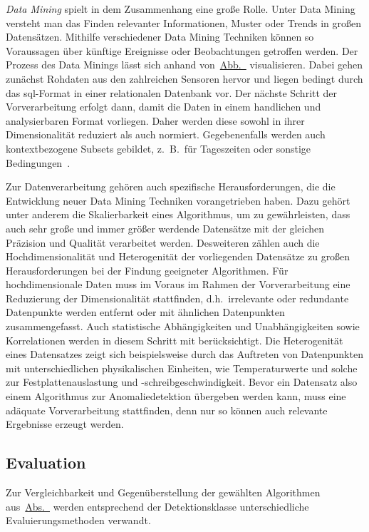 \textit{Data Mining} spielt in dem Zusammenhang eine große Rolle. Unter Data Mining versteht man das Finden relevanter Informationen,
Muster oder Trends in großen Datensätzen. Mithilfe verschiedener Data Mining Techniken können so Voraussagen über künftige Ereignisse oder
Beobachtungen getroffen werden. Der Prozess des Data Minings lässt sich anhand von~\hyperref[fig:data_mining]{Abb.~}
visualisieren. Dabei gehen zunächst Rohdaten aus den zahlreichen Sensoren hervor und liegen bedingt durch das \ac{sql}-Format in einer
relationalen Datenbank vor. Der nächste Schritt der Vorverarbeitung erfolgt dann, damit die Daten in einem handlichen und analysierbaren
Format vorliegen. Daher werden diese sowohl in ihrer Dimensionalität reduziert als auch normiert. Gegebenenfalls werden auch
kontextbezogene Subsets gebildet, z.~B.~für Tageszeiten oder sonstige Bedingungen~\Cite[Kap.~1]{Tan2014}.

Zur Datenverarbeitung gehören auch spezifische Herausforderungen, die die Entwicklung neuer Data Mining Techniken vorangetrieben haben.
Dazu gehört unter anderem die Skalierbarkeit eines Algorithmus, um zu gewährleisten, dass auch sehr große und immer größer werdende
Datensätze mit der gleichen Präzision und Qualität verarbeitet werden. Desweiteren zählen auch die Hochdimensionalität und Heterogenität
der vorliegenden Datensätze zu großen Herausforderungen bei der Findung geeigneter Algorithmen. Für hochdimensionale Daten muss im Voraus
im Rahmen der Vorverarbeitung eine Reduzierung der Dimensionalität stattfinden, d.h.~irrelevante oder redundante Datenpunkte werden
entfernt oder mit ähnlichen Datenpunkten zusammengefasst. Auch statistische Abhängigkeiten und Unabhängigkeiten sowie Korrelationen
werden in diesem Schritt mit berücksichtigt. Die Heterogenität eines Datensatzes zeigt sich beispielsweise durch das Auftreten von
Datenpunkten mit unterschiedlichen physikalischen Einheiten, wie Temperaturwerte und solche zur Festplattenauslastung und
-schreibgeschwindigkeit. Bevor ein Datensatz also einem Algorithmus zur Anomaliedetektion übergeben werden kann, muss eine adäquate
Vorverarbeitung stattfinden, denn nur so können auch relevante Ergebnisse erzeugt werden.


\subsection{Evaluation}\label{subsec:evaluation}
Zur Vergleichbarkeit und Gegenüberstellung der gewählten Algorithmen aus~\hyperref[sec:algorithmen]{Abs.~} werden
entsprechend der Detektionsklasse unterschiedliche Evaluierungsmethoden verwandt.


